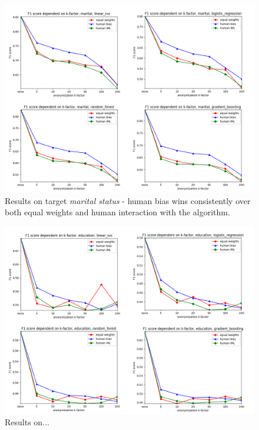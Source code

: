 \documentclass{llncs}
\begin{document}
\begin{figure}[!h]
	\begin{center}
		\hspace*{-0.8cm}
		\includegraphics[width=1.1\textwidth]{figures/marital_status.png}
		\caption{Results on target \textit{marital status} - human bias wins consistently over both equal weights and human interaction with the algorithm.}
		\label{fig:results_marital}
	\end{center}
\end{figure}


\begin{figure}[!h]
	\begin{center}
		\hspace*{-0.8cm}
		\includegraphics[width=1.1\textwidth]{figures/education_num.png}
		\caption{Results on...}
		\label{fig:results_education}
	\end{center}
\end{figure}
\end{document}
